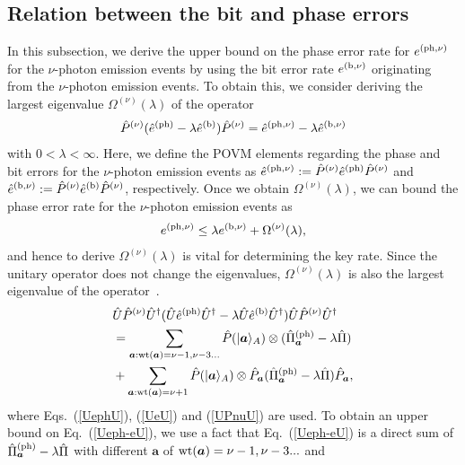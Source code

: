 \documentclass[prl,twocolumn,superscriptaddress,nofootinbib]{revtex4}
\def\U#1{{\rm #1}}
\newcommand{\ket}[1]{| #1 \rangle}
\begin{document}
\subsection{Relation between the bit and phase errors}
\label{sec:relation}
In this subsection, we derive the upper bound on the phase error rate for $e^{(\U{ph},\nu)}$ for the $\nu$-photon emission events
by using the bit error rate $e^{(\U{b},\nu)}$ originating from the $\nu$-photon emission events. 
To obtain this, we consider deriving the largest eigenvalue $\Omega^{(\nu)}(\lambda)$ of the operator 
\begin{align}
  \hat{P}^{(\nu)}(\hat{e}^{(\U{ph})}-\lambda\hat{e}^{(\U{b})})\hat{P}^{(\nu)}=\hat{e}^{(\U{ph},\nu)}-\lambda\hat{e}^{(\U{b},\nu)}
  \label{Pnuephe}
\end{align}
with $0<\lambda<\infty$.
Here, we define the POVM elements regarding the phase and bit errors for the $\nu$-photon emission events as 
$\hat{e}^{(\U{ph},\nu)}:=\hat{P}^{(\nu)}\hat{e}^{(\U{ph})}\hat{P}^{(\nu)}$ and
$\hat{e}^{(\U{b},\nu)}:=\hat{P}^{(\nu)}\hat{e}^{(\U{b})}\hat{P}^{(\nu)}$, respectively. 
Once we obtain $\Omega^{(\nu)}(\lambda)$, we can bound the phase error rate for the $\nu$-photon emission events as
\begin{align}
  e^{(\U{ph},\nu)}\leq\lambda e^{(\U{b},\nu)}+\Omega^{(\nu)}(\lambda),
  \label{relationeph}
\end{align}
and hence to derive $\Omega^{(\nu)}(\lambda)$ is vital for determining the key rate. 
Since the unitary operator does not change the eigenvalues, $\Omega^{(\nu)}(\lambda)$ is also the largest eigenvalue of the
operator~\cite{Kiyoshi2012dps}. 
\begin{align}
  &\hat{U}\hat{P}^{(\nu)}\hat{U}^{\dagger}(\hat{U}\hat{e}^{(\U{ph})}\hat{U}^{\dagger}-\lambda\hat{U}\hat{e}^{(\U{b})}\hat{U}^{\dagger})
  \hat{U}\hat{P}^{(\nu)}\hat{U}^{\dagger}\notag\\
  &=\sum_{{\bm{a}}:\U{wt}({\bm{a}})=\nu-1,\nu-3...}\hat{P}(\ket{{\bm{a}}}_A)\otimes(\hat{\Pi}^{\U{(ph)}}_{{\bm{a}}}-\lambda\hat{\Pi})\notag\\
  &+\sum_{{\bm{a}}:\U{wt}({\bm{a}})
    =\nu+1}\hat{P}(\ket{{\bm{a}}}_A)\otimes \hat{P}_{\bm{a}}(\hat{\Pi}^{\U{(ph)}}_{{\bm{a}}}-\lambda\hat{\Pi})\hat{P}_{\bm{a}},
  \label{Ueph-eU}
\end{align}
where Eqs.~(\ref{UephU}), (\ref{UeU}) and (\ref{UPnuU}) are used. 
To obtain an upper bound on Eq.~(\ref{Ueph-eU}), we use a fact that Eq.~(\ref{Ueph-eU}) is a direct sum of
$\hat{\Pi}^{\U{(ph)}}_{{\bm{a}}}-\lambda\hat{\Pi}$ with different ${\bm{a}}$ of $\U{wt}({\bm{a}})=\nu-1,\nu-3...$ and
\end{document}
